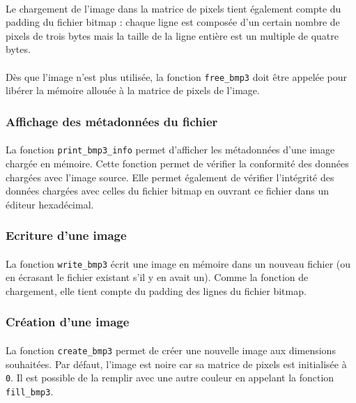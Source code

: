 \documentclass{article}
\begin{document}
    \paragraph{}
    Le chargement de l'image dans la matrice de pixels tient également compte du padding du fichier bitmap : chaque ligne est composée d'un certain nombre de pixels de trois bytes mais la taille de la ligne entière est un multiple de quatre bytes.
    
    \paragraph{}
    Dès que l'image n'est plus utilisée, la fonction \texttt{free\_bmp3} doit être appelée pour libérer la mémoire allouée à la matrice de pixels de l'image.

    \subsubsection{Affichage des métadonnées du fichier}
    \paragraph{}
    La fonction \texttt{print\_bmp3\_info} permet d'afficher les métadonnées d'une image chargée en mémoire. Cette fonction permet de vérifier la conformité des données chargées avec l'image source. Elle permet également de vérifier l'intégrité des données chargées avec celles du fichier bitmap en ouvrant ce fichier dans un éditeur hexadécimal.

    \subsubsection{Ecriture d'une image}
    \paragraph{}
    La fonction \texttt{write\_bmp3} écrit une image en mémoire dans un nouveau fichier (ou en écrasant le fichier existant s'il y en avait un). Comme la fonction de chargement, elle tient compte du padding des lignes du fichier bitmap.

    \subsubsection{Création d'une image}
    \paragraph{}
    La fonction \texttt{create\_bmp3} permet de créer une nouvelle image aux dimensions souhaitées. Par défaut, l'image est noire car sa matrice de pixels est initialisée à \texttt{0}. Il est possible de la remplir avec une autre couleur en appelant la fonction \texttt{fill\_bmp3}.
\end{document}
